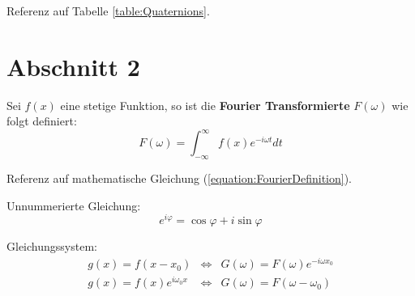 Referenz auf Tabelle \ref{table:Quaternions}.

\section{Abschnitt 2}
\label{section:MathematicalStuff}

Sei $f(x)$ eine stetige Funktion, so ist die \textbf{Fourier Transformierte}
$F(\omega)$ wie folgt definiert:
\begin{equation}
\label{equation:FourierDefinition}
	F(\omega) = \int_{-\infty}^{\infty} f(x) e^{-i\omega t} dt
\end{equation}

Referenz auf mathematische Gleichung (\ref{equation:FourierDefinition}).

Unnummerierte Gleichung:
\begin{equation*}
	e^{i\varphi} = \cos\varphi + i \sin\varphi
\end{equation*}

Gleichungssystem:
\begin{eqnarray}
	g(x) = f(x - x_0) & \Leftrightarrow &
		G(\omega) = F(\omega) e^{-i\omega x_0} \\
	g(x) = f(x) e^{i\omega_0 x} & \Leftrightarrow &
		G(\omega) = F(\omega - \omega_0)
\end{eqnarray}
